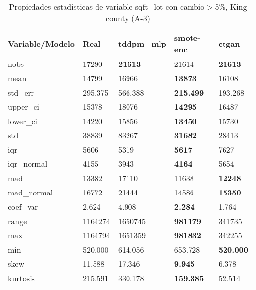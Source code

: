 \begin{table}[H]
\centering
\fontsize{8}{14}\selectfont
\caption{Propiedades estadisticas de variable sqft\_lot con cambio\ensuremath{>}5\%, King county (A-3)}
\label{table-stats-king county-a-3-sqft_lot-short}
\begin{tabular}{|l|m{10em}|m{10em}|m{10em}|m{10em}|}
\hline
 \rowcolor[gray]{0.8}
Variable/Modelo & Real & tddpm\_mlp & smote-enc & ctgan \\
\hline nobs & 17290 & \bfseries 21613 & \cellcolor[rgb]{0.9, 0.54, 0.52} 21614 & \bfseries 21613 \\
\hline mean & 14799 & \cellcolor[rgb]{0.9, 0.54, 0.52} 16966 & \bfseries 13873 & 16108 \\
\hline std\_err & 295.375 & \cellcolor[rgb]{0.9, 0.54, 0.52} 566.388 & \bfseries 215.499 & 193.268 \\
\hline upper\_ci & 15378 & \cellcolor[rgb]{0.9, 0.54, 0.52} 18076 & \bfseries 14295 & 16487 \\
\hline lower\_ci & 14220 & \cellcolor[rgb]{0.9, 0.54, 0.52} 15856 & \bfseries 13450 & 15730 \\
\hline std & 38839 & \cellcolor[rgb]{0.9, 0.54, 0.52} 83267 & \bfseries 31682 & 28413 \\
\hline iqr & 5606 & 5319 & \bfseries 5617 & \cellcolor[rgb]{0.9, 0.54, 0.52} 7627 \\
\hline iqr\_normal & 4155 & 3943 & \bfseries 4164 & \cellcolor[rgb]{0.9, 0.54, 0.52} 5654 \\
\hline mad & 13382 & \cellcolor[rgb]{0.9, 0.54, 0.52} 17110 & 11638 & \bfseries 12248 \\
\hline mad\_normal & 16772 & \cellcolor[rgb]{0.9, 0.54, 0.52} 21444 & 14586 & \bfseries 15350 \\
\hline coef\_var & 2.624 & \cellcolor[rgb]{0.9, 0.54, 0.52} 4.908 & \bfseries 2.284 & 1.764 \\
\hline range & 1164274 & 1650745 & \bfseries 981179 & \cellcolor[rgb]{0.9, 0.54, 0.52} 341735 \\
\hline max & 1164794 & 1651359 & \bfseries 981832 & \cellcolor[rgb]{0.9, 0.54, 0.52} 342255 \\
\hline min & 520.000 & 614.056 & \cellcolor[rgb]{0.9, 0.54, 0.52} 653.728 & \bfseries 520.000 \\
\hline skew & 11.588 & \cellcolor[rgb]{0.9, 0.54, 0.52} 17.346 & \bfseries 9.945 & 6.378 \\
\hline kurtosis & 215.591 & 330.178 & \bfseries 159.385 & \cellcolor[rgb]{0.9, 0.54, 0.52} 52.514 \\

\end{tabular}
\end{table}
